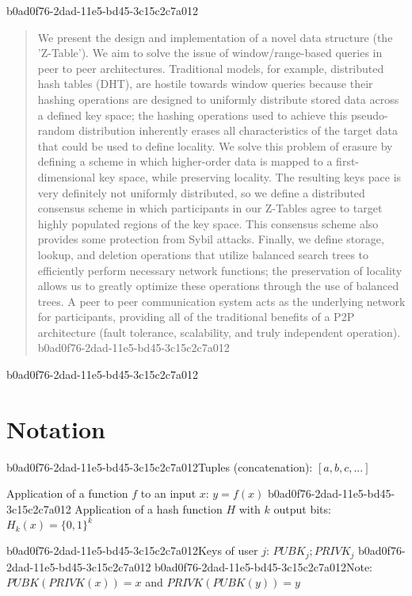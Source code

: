 \documentclass[12pt]{article}
\begin{document}
b0ad0f76-2dad-11e5-bd45-3c15c2c7a012\maketitle

\begin{abstract}
We present the design and implementation of a novel data structure (the 'Z-Table'). We aim to solve the issue of window/range-based queries in peer to peer architectures. Traditional models, for example,  distributed hash tables (DHT), are hostile towards window queries because their hashing operations are designed to uniformly distribute stored data across a defined key space; the hashing operations used to achieve this pseudo-random distribution inherently erases all characteristics of the target data that could be used to define locality. We solve this problem of erasure by defining a scheme in which higher-order data is mapped to a first-dimensional key space, while preserving locality. The resulting keys pace is very definitely not uniformly distributed, so we define a distributed consensus scheme in which participants in our Z-Tables agree to target highly populated regions of the key space. This consensus scheme also provides some protection from Sybil attacks. Finally, we define storage, lookup, and deletion operations that utilize balanced search trees to efficiently perform necessary network functions; the preservation of locality allows us to greatly optimize these operations through the use of balanced trees. A peer to peer communication system acts as the underlying network for participants, providing all of the traditional benefits of a P2P architecture (fault tolerance, scalability, and truly independent operation).
b0ad0f76-2dad-11e5-bd45-3c15c2c7a012\end{abstract}

b0ad0f76-2dad-11e5-bd45-3c15c2c7a012\section{Notation}

b0ad0f76-2dad-11e5-bd45-3c15c2c7a012Tuples (concatenation): $[a,b,c,...]$

Application of a function $f$ to an input $x$: $y=f(x)$
b0ad0f76-2dad-11e5-bd45-3c15c2c7a012
Application of a hash function $H$ with $k$ output bits: $H_{k}(x) = \{0,1\}^k$

b0ad0f76-2dad-11e5-bd45-3c15c2c7a012Keys of user $j$: $ PUBK_j; PRIVK_j $
b0ad0f76-2dad-11e5-bd45-3c15c2c7a012
b0ad0f76-2dad-11e5-bd45-3c15c2c7a012Note: $PUBK(PRIVK(x)) = x$ and $PRIVK(PUBK(y)) = y$~
\end{document}
